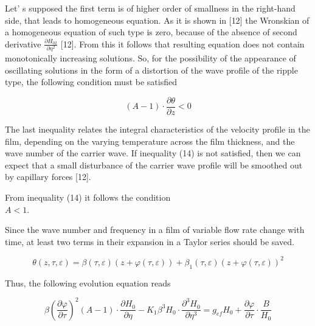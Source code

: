 \begin{multicols}{2}
Let' s supposed the first term is of higher order of smallness in the
right-hand side, that leads to homogeneous equation. As it is shown in
{[}12{]} the Wronskian of a homogeneous equation of such type is zero,
because of the absence of second derivative $\frac{\partial
H_{02}}{\partial \eta^2}$ {[}12{]}. From this it follows that
resulting equation does not contain monotonically increasing
solutions. So, for the possibility of the appearance of oscillating
solutions in the form of a distortion of the wave profile of the
ripple type, the following condition must be satisfied

\begin{equation}
(A - 1) \cdot \frac{\partial \theta}{\partial z} < 0
\end{equation}

The last inequality relates the integral characteristics of the
velocity profile in the film, depending on the varying temperature
across the film thickness, and the wave number of the carrier wave. If
inequality (14) is not satisfied, then we can expect that a small
disturbance of the carrier wave profile will be smoothed out by
capillary forces {[}12{]}.

From inequality (14) it follows the condition \\$A<1$.

Since the wave number and frequency in a film of variable flow rate
change with time, at least two terms in their expansion in a Taylor
series should be saved.
\end{multicols}

\begin{equation}
\theta(z, \tau, \varepsilon) = \beta(\tau, \varepsilon) \left(z + \varphi(\tau, \varepsilon)\right)
+ \beta_1(\tau, \varepsilon) \left(z + \varphi(\tau, \varepsilon)\right)^2
\end{equation}

Thus, the following evolution equation reads

\begin{equation}
\beta \left( \frac{\partial \varphi}{\partial \tau} \right)^2 (A - 1) \cdot \frac{\partial H_0}{\partial \eta}
- K_1 \beta^3 H_0 \cdot \frac{\partial^3 H_0}{\partial \eta^3}
= g_{\mathit{ef}} H_0 + \frac{\partial \varphi}{\partial \tau} \cdot \frac{B}{H_0}
\end{equation}

